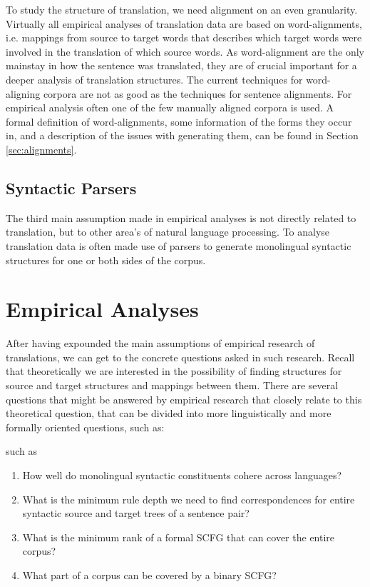 \documentclass{report}
\theoremstyle{definition}
\theoremstyle{plain}
\begin{document}
To study the structure of translation, we need alignment on an even granularity. Virtually all empirical analyses of translation data are based on word-alignments, i.e. mappings from source to target words that describes which target words were involved in the translation of which source words. As word-alignment are the only mainstay in how the sentence was translated, they are of crucial important for a deeper analysis of translation structures. The current techniques for word-aligning corpora are not as good as the techniques for sentence alignments. For empirical analysis often one of the few manually aligned corpora is used. A formal definition of word-alignments, some information of the forms they occur in, and a description of the issues with generating them, can be found in Section \ref{sec:alignments}.

\subsection{Syntactic Parsers}

The third main assumption made in empirical analyses is not directly related to translation, but to other area's of natural language processing. To analyse translation data is often made use of parsers to generate monolingual syntactic structures for one or both sides of the corpus. 


\section{Empirical Analyses}

After having expounded the main assumptions of empirical research of translations, we can get to the concrete questions asked in such research. Recall that theoretically we are interested in the possibility of finding structures for source and target structures and mappings between them. There are several questions that might be answered by empirical research that closely relate to this theoretical question, that can be divided into more linguistically and more formally oriented questions, such as:

such as\begin{enumerate}
\item How well do monolingual syntactic constituents cohere across languages?
\item What is the minimum rule depth we need to find correspondences for entire syntactic source and target trees of a sentence pair?
\item What is the minimum rank of a formal SCFG that can cover the entire corpus?
\item What part of a corpus can be covered by a binary SCFG?
\end{enumerate}
\end{document}
